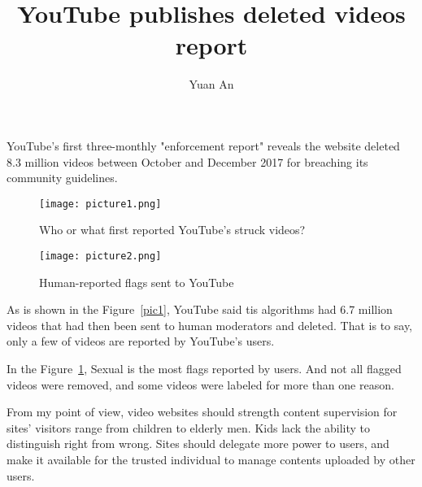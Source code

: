 \documentclass[a4paper,12pt]{article}
\title{YouTube publishes deleted videos report}
\author{Yuan An}
\begin{document}
\maketitle

YouTube's first three-monthly "enforcement report" reveals the website deleted 8.3 million videos between October and December 2017 for breaching its community guidelines.
\par
\begin{figure}[htp]
	\centering
	\texttt{[image: picture1.png]}
	\caption{Who or what first reported YouTube's struck videos?}\label{pic1}
	\centering
	\texttt{[image: picture2.png]}
	\caption{Human-reported flags sent to YouTube}\label{pic2}
\end{figure}
\par
As is shown in the Figure~\ref{pic1}, YouTube said tis algorithms had 6.7 million videos that had then been sent to human moderators and deleted. That is to say, only a few of videos are reported by YouTube's users.
\par
In the Figure~\ref{pic2}, Sexual is the most flags reported by users. And not all flagged videos were removed, and some videos were labeled for more than one reason. 
\par
From my point of view, video websites should strength content supervision for sites' visitors range from children to elderly men. Kids lack the ability to distinguish right from wrong. Sites should delegate more power to users, and make it available for the trusted individual to manage contents uploaded by other users.
\end{document}
